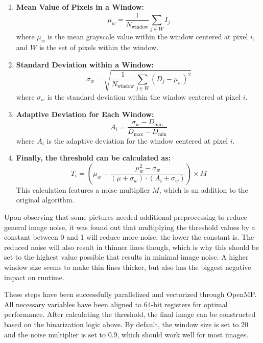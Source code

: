 \documentclass[sigconf]{acmart}
\begin{document}
\begin{enumerate}
    \item \textbf{Mean Value of Pixels in a Window:}  
    \begin{equation}
        \mu_{w} = \frac{1}{N_{\text{window}}} \sum_{j \in W} I_j
    \end{equation}
    where \( \mu_{w} \) is the mean grayscale value within the window centered at pixel \( i \), and \( W \) is the set of pixels within the window.

    \item \textbf{Standard Deviation within a Window:}  
    \begin{equation}
        \sigma_{w} = \sqrt{\frac{1}{N_{\text{window}}} \sum_{j \in W} (D_j - \mu_{w})^2}
    \end{equation}
    where \( \sigma_{w} \) is the standard deviation within the window centered at pixel \( i \).

    \item \textbf{Adaptive Deviation for Each Window:}  
    \begin{equation}
        A_i = \frac{\sigma_{w} - D_{\min}}{D_{\max} - D_{\min}}
    \end{equation}
    where \( A_i \) is the adaptive deviation for the window centered at pixel \( i \).

    \item \textbf{Finally, the threshold can be calculated as:}
    \begin{equation}
        T_i = \left( \mu_{w} - \frac{\mu_{w}^2 - \sigma_{w}}{(\mu + \sigma_{w}) \cdot (A_i + \sigma_{w})} \right) \times M
    \end{equation}
    This calculation features a noise multiplier \( M \), which is an addition to the original algorithm. 
\end{enumerate}


Upon observing that some pictures needed additional preprocessing to reduce general image noise, it was found out that multiplying the threshold values by a constant between 0 and 1 will reduce more noise, the lower the constant is. The reduced noise will also result in thinner lines though, which is why this should be set to the highest value possible that results in minimal image noise. A higher window size seems to make thin lines thicker, but also has the biggest negative impact on runtime.

These steps have been successfully parallelized and vectorized through OpenMP. All necessary variables have been aligned to 64-bit registers for optimal performance.
After calculating the threshold, the final image can be constructed based on the binarization logic above.
By default, the window size is set to 20 and the noise multiplier is set to 0.9, which should work well for most images.
\end{document}
